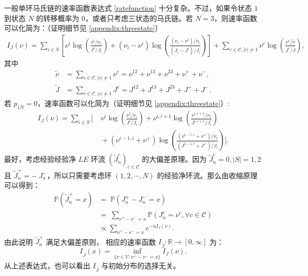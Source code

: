 一般单环马氏链的速率函数表达式 \eqref{ratefunction} 十分复杂。不过，如果令状态 $1$ 到状态 $N$ 的转移概率为 0，或者只考虑三状态的马氏链。若 $N=3$，则速率函数可以化简为：（证明细节见 \ref{appendix:threestate}）
\begin{align*}
    I_J(\nu) =
    \sum_{i\in S} \left[\nu^{i}\log \left(\frac{\nu^{i}/\nu_i}{J^i/J_i}\right) + (\nu_i - \nu^i)\log \left(\frac{(\nu_i - \nu^i)/\nu_i}{(J_i - J^i)/J_i} \right)
    \right]
    + \sum_{c\in\mathcal{C},|c|\neq 1} \nu^{c} \log \left(\frac{\nu^{c}/\tilde{\nu}}{J^c/\tilde{J}}\right) ,
\end{align*}
其中
\begin{align*}
    \tilde{\nu} &=\sum_{c\in\mathcal{C},|c|\neq 1}\nu^{c}
    = \nu^{12}+\nu^{13}+\nu^{23}+\nu^++\nu^-,\\
    \tilde{J} &=\sum_{c\in\mathcal{C},|c|\neq 1}J^{c}
    = J^{12}+J^{13}+J^{23}+J^++J^-.
\end{align*}
若 $p_{1N}=0$，速率函数可以化简为（证明细节见 \ref{appendix:threestate}）:
\begin{equation}\label{lack}
    \begin{split}
        I_J(\nu) = \sum_{i\in S}\Bigg[&\;\nu^i\log\left(\frac{\nu^i/\nu_i}{J^i/J_i}\right)
        +\nu^{i,i+1}\log\left(\frac{\nu^{i,i+1}/\nu_i}{J^{i,i+1}/J_i}\right)\\
        &\;+\left(\nu^{i-1,i}+\nu^+\right)\log\left(\frac{\left(\nu^{i-1,i}+\nu^+\right)/\nu_i}
        {\left(J^{i-1,i}+J^+\right)/J_i}\right)\Bigg].
    \end{split}
\end{equation}
最好，考虑经验经验净 $LE$ 环流 $(\tilde{J}^{c}_n)_{c\in\mathcal{C}}$ 的大偏差原理。因为 $\tilde{J}^c_n = 0, |S|=1,2$ 且 $\tilde{J}^+_n = -\ {J}^-_n$，所以只需要考虑环 $(1, 2, \cdots ,N)$ 的经验净环流。那么由收缩原理可以得到：
\begin{equation}\label{tilde I J}
	\begin{split}
		\mathbb{P}\left(\tilde{J}^{+}_n = x\right)
		&=\;\mathbb{P}\left(J^{+}_n-J^{-}_n = x\right)\\
		&=\;\sum_{\nu^{+}-\nu^{-}=x}\mathbb{P}\left(J^{c}_n=\nu^{c},\forall c\in\mathcal{C}\right)\\
		&\propto\sum_{\nu^{+}-\nu^{-}=x} e^{-nI_J(\nu)}.
	\end{split}
\end{equation}
由此说明 $\tilde{J}^+_n$ 满足大偏差原则， 相应的速率函数 $I_{\tilde{J}}:\mathbb{R}\rightarrow[0,\infty]$ 为：
\begin{equation*}
	I_{\tilde{J}}(x)=\inf_{\{\nu\in\mathcal{V}:\nu^{+}-\nu^{-}= x\}}I_J(\nu).
\end{equation*} 
从上述表达式，也可以看出 $I_{\tilde{J}}$ 与初始分布的选择无关。

